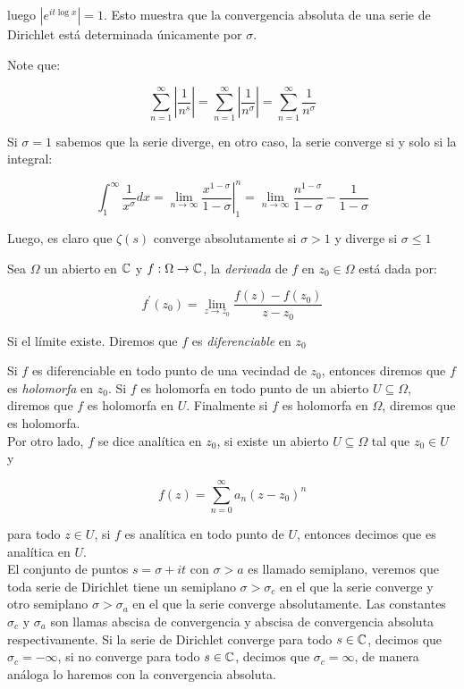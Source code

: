 luego $\left| e^{\displaystyle it\log x}\right|=1$. Esto muestra que la convergencia absoluta de una serie de Dirichlet está determinada únicamente por $\sigma$.

\begin{eg}
Note que:

$$\sum_{n=1}^{\infty} \left|\frac{1}{n^s}\right|=\sum_{n=1}^{\infty} \left|\frac{1}{n^{\sigma}}\right|=\sum_{n=1}^{\infty} \frac{1}{n^{\sigma}}$$

Si $\sigma=1$ sabemos que la serie diverge, en otro caso, la serie converge si y solo si la integral:

$$\int_1^{\infty}\frac{1}{x^\sigma}dx=\lim_{n \to \infty}\left.\dfrac{x^{1-\sigma}}{1-\sigma}\right|_1^{n}=\lim _{n \rightarrow \infty} \frac{n^{1-\sigma}}{1-\sigma}-\frac{1}{1-\sigma}$$

Luego, es claro que $\zeta(s)$ converge absolutamente si $\sigma>1$ y diverge  si $\sigma\leq 1$
\end{eg}

\begin{definition}
Sea $\Omega$ un abierto en $\mathbb{C}$ y $f:\Omega \to \mathbb{C}$, la \textit{derivada} de $f$ en $z_0\in \Omega$ está dada por:

$$f^{\prime}(z_0)=\lim_{z \to z_0} \frac{f(z)-f(z_0)}{z-z_0}$$

Si el límite existe. Diremos que $f$ es \textit{diferenciable} en $z_0$
\end{definition}

Si $f$ es diferenciable en todo punto de una vecindad de $z_0$, entonces diremos que $f$ es \textit{holomorfa} en $z_0$. Si $f$ es holomorfa en todo punto de un abierto $U\subseteq\Omega$, diremos que $f$ es holomorfa en $U$. Finalmente si $f$ es holomorfa en $\Omega$, diremos que es holomorfa.\\

Por otro lado, $f$ se dice analítica en $z_0$, si existe un abierto $U\subseteq \Omega$ tal que $z_0\in U$ y

$$f(z)=\sum_{n=0}^{\infty} a_n (z-z_0)^n$$

para todo $z\in U$, si $f$ es analítica en todo punto de $U$, entonces decimos que es analítica  en $U$.\\

El conjunto de puntos $s=\sigma+it$ con $\sigma>a$ es llamado semiplano, veremos que toda serie de Dirichlet tiene un semiplano $\sigma>\sigma_c$ en el que la serie converge y otro semiplano $\sigma>\sigma_a$ en el que la serie converge absolutamente. Las constantes $\sigma_c$ y $\sigma_a$ son llamas abscisa de convergencia y abscisa de convergencia absoluta respectivamente. Si la serie de Dirichlet converge para todo $s\in \mathbb{C}$, decimos que $\sigma_c=-\infty$, si no converge para todo $s\in \mathbb{C}$, decimos que $\sigma_c=\infty$, de manera análoga lo haremos con la convergencia absoluta.\cite{pongsriiam2023analytic}


